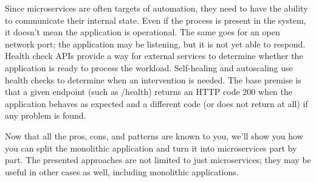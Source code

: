 Since microservices are often targets of automation, they need to have the ability to communicate their internal state. Even if the process is present in the system, it doesn't mean the application is operational. The same goes for an open network port; the application may be listening, but it is not yet able to respond. Health check APIs provide a way for external services to determine whether the application is ready to process the workload. Self-healing and autoscaling use health checks to determine when an intervention is needed. The base premise is that a given endpoint (such as /health) returns an HTTP code 200 when the application behaves as expected and a different code (or does not return at all) if any problem is found.

Now that all the pros, cons, and patterns are known to you, we'll show you how you can split the monolithic application and turn it into microservices part by part. The presented approaches are not limited to just microservices; they may be useful in other cases as well, including monolithic applications.















